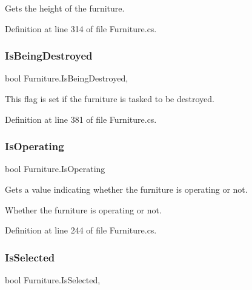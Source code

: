 Gets the height of the furniture. 



Definition at line 314 of file Furniture.\+cs.

\mbox{\label{class_furniture_a4faff1043382e7b48824a2a16eb15712}} 
\subsubsection{\texorpdfstring{Is\+Being\+Destroyed}{IsBeingDestroyed}}
{\footnotesize\ttfamily bool Furniture.\+Is\+Being\+Destroyed\hspace{0.3cm}{\ttfamily [get]}, {}}



This flag is set if the furniture is tasked to be destroyed. 



Definition at line 381 of file Furniture.\+cs.

\mbox{\label{class_furniture_addc32913065ddd0ee4660b2de3f84a42}} 
\subsubsection{\texorpdfstring{Is\+Operating}{IsOperating}}
{\footnotesize\ttfamily bool Furniture.\+Is\+Operating\hspace{0.3cm}{\ttfamily [get]}}



Gets a value indicating whether the furniture is operating or not. 

Whether the furniture is operating or not.

Definition at line 244 of file Furniture.\+cs.

\mbox{\label{class_furniture_a5ae8766d2419a00dfadc9728100ef68e}} 
\subsubsection{\texorpdfstring{Is\+Selected}{IsSelected}}
{\footnotesize\ttfamily bool Furniture.\+Is\+Selected\hspace{0.3cm}{\ttfamily [get]}, {\ttfamily [set]}}



